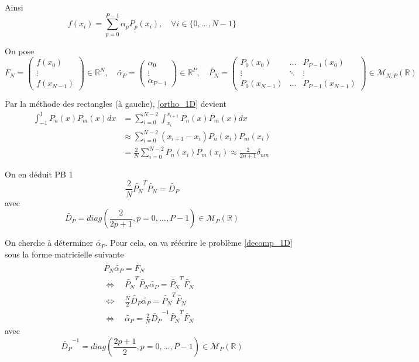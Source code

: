 Ainsi
$$f(x_i)=\sum_{p=0}^{P-1}\alpha_p P_p(x_i), \quad \forall i\in\{0,\dots,N-1\}$$

On pose
$$\widetilde{F_N}=\begin{pmatrix}
	f(x_0) \\
	\vdots \\
	f(x_{N-1})
\end{pmatrix}\in\mathbb{R}^N, \quad \widetilde{\alpha_P}=\begin{pmatrix}
	\alpha_0 \\
	\vdots \\
	\alpha_{P-1}
\end{pmatrix}\in\mathbb{R}^P, \quad \widetilde{P_N}=\begin{pmatrix}
	P_0(x_0) & \dots & P_{P-1}(x_0) \\
	\vdots & \ddots & \vdots \\
	P_0(x_{N-1}) & \dots & P_{P-1}(x_{N-1})
\end{pmatrix}\in\mathcal{M}_{N,P}(\mathbb{R})$$

Par la méthode des rectangles (à gauche), \ref{ortho_1D} devient
\begin{align*}
	\int_{-1}^1 P_n(x)P_m(x)dx&=\sum_{i=0}^{N-2}\int_{x_i}^{x_{i+1}}P_n(x)P_m(x)dx \\
	&\approx \sum_{i=0}^{N-2} (x_{i+1}-x_i)P_n(x_i)P_m(x_i) \\
	&=\frac{2}{N}\sum_{i=0}^{N-2} P_n(x_i)P_m(x_i) \approx\frac{2}{2n+1}\delta_{nm} 
\end{align*}

On en déduit \color{red}PB 1\color{black}
\begin{equation}
	\frac{2}{N}\widetilde{P_N}^T\widetilde{P_N}=\widetilde{D_P}\label{diag_1D}
\end{equation}
avec
$$\widetilde{D_P}=diag\left(\frac{2}{2p+1},p=0,\dots,P-1\right)\in\mathcal{M}_P(\mathbb{R})$$

On cherche à déterminer $\widetilde{\alpha_P}$. Pour cela, on va réécrire le problème \ref{decomp_1D} sous la forme matricielle suivante
\begin{align*}
	\widetilde{P_N}\widetilde{\alpha_P}=\widetilde{F_N}& \\
	\iff \quad \widetilde{P_N}^T\widetilde{P_N}\widetilde{\alpha_P}=\widetilde{P_N}^T\widetilde{F_N}& \\
	\iff \quad \frac{N}{2}\widetilde{D_P}\widetilde{\alpha_P}=\widetilde{P_N}^T\widetilde{F_N}& \\
	\iff \quad \boxed{\widetilde{\alpha_P}=\frac{2}{N}\widetilde{D_P}^{-1}\widetilde{P_N}^T\widetilde{F_N}}&
\end{align*}
avec
$$\widetilde{D_P}^{-1}=diag\left(\frac{2p+1}{2},p=0,\dots,P-1\right)\in\mathcal{M}_P(\mathbb{R})$$

